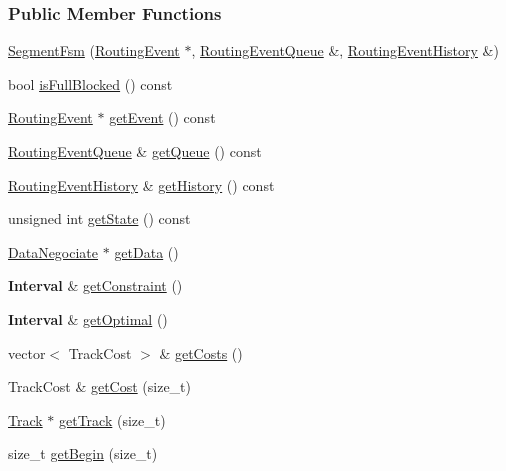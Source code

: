 \subsubsection*{Public Member Functions}
\begin{DoxyCompactItemize}
\item 
\hyperlink{classKite_1_1SegmentFsm_a2a8eadaaf3ed213914e7b4a81cae6e6a}{Segment\+Fsm} (\hyperlink{classKite_1_1RoutingEvent}{Routing\+Event} $\ast$, \hyperlink{classKite_1_1RoutingEventQueue}{Routing\+Event\+Queue} \&, \hyperlink{classKite_1_1RoutingEventHistory}{Routing\+Event\+History} \&)
\item 
bool \hyperlink{classKite_1_1SegmentFsm_a90fb28e997bec986238b81c0316319f0}{is\+Full\+Blocked} () const
\item 
\hyperlink{classKite_1_1RoutingEvent}{Routing\+Event} $\ast$ \hyperlink{classKite_1_1SegmentFsm_a513f39c546ef4be0d13787cdace4eadf}{get\+Event} () const
\item 
\hyperlink{classKite_1_1RoutingEventQueue}{Routing\+Event\+Queue} \& \hyperlink{classKite_1_1SegmentFsm_a3e86badede6ba842280779cecea21e81}{get\+Queue} () const
\item 
\hyperlink{classKite_1_1RoutingEventHistory}{Routing\+Event\+History} \& \hyperlink{classKite_1_1SegmentFsm_a1bf115c7f375168ec89ec400d58440b4}{get\+History} () const
\item 
unsigned int \hyperlink{classKite_1_1SegmentFsm_a40ec2b23684a0e6e6d7ac9783a269037}{get\+State} () const
\item 
\hyperlink{classKite_1_1DataNegociate}{Data\+Negociate} $\ast$ \hyperlink{classKite_1_1SegmentFsm_ad272e2f3fbbddcd6c8dc2f0187f08c4e}{get\+Data} ()
\item 
\textbf{ Interval} \& \hyperlink{classKite_1_1SegmentFsm_abf6603c742bee65a4effa24135f2d955}{get\+Constraint} ()
\item 
\textbf{ Interval} \& \hyperlink{classKite_1_1SegmentFsm_a9d1a7f4108b49d3096d8c733fabe60f3}{get\+Optimal} ()
\item 
vector$<$ Track\+Cost $>$ \& \hyperlink{classKite_1_1SegmentFsm_ab7144079976c8808e69f9aac68dda06d}{get\+Costs} ()
\item 
Track\+Cost \& \hyperlink{classKite_1_1SegmentFsm_a5256595f77ebc80c3ee683cfdbc7f8f6}{get\+Cost} (size\+\_\+t)
\item 
\hyperlink{classKite_1_1Track}{Track} $\ast$ \hyperlink{classKite_1_1SegmentFsm_af2d9a3a5df8a4de5d263fb3fae563a8a}{get\+Track} (size\+\_\+t)
\item 
size\+\_\+t \hyperlink{classKite_1_1SegmentFsm_a13a1ec8bdcf29f2bcb21cab348b77ed2}{get\+Begin} (size\+\_\+t)

\end{DoxyCompactItemize}
